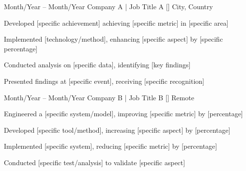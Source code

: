 \begin{resumeSubEvent}
  {Month/Year -- Month/Year}
  {Company A | Job Title A [\href{https://www.companya.com}{\faBuilding}]}
  {City, Country}
  {%
  \begin{resumeItemList}
  \item Developed [specific achievement] achieving [specific metric] in [specific area]
  \item Implemented [technology/method], enhancing [specific aspect] by [specific percentage]
  \item Conducted analysis on [specific data], identifying [key findings]
  \item Presented findings at [specific event], receiving [specific recognition]
  \end{resumeItemList}
  }%
\end{resumeSubEvent}

\begin{resumeSubEvent}
  {Month/Year -- Month/Year}
  {Company B | Job Title B [\href{https://www.companyb.com}{\faBuilding}]}
  {Remote}
  {%
  \begin{resumeItemList}
  \item Engineered a [specific system/model], improving [specific metric] by [percentage]
  \item Developed [specific tool/method], increasing [specific aspect] by [percentage]
  \item Implemented [specific system], reducing [specific metric] by [percentage]
  \item Conducted [specific test/analysis] to validate [specific aspect]
  \end{resumeItemList}
  }%
\end{resumeSubEvent}